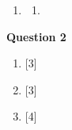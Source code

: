 \begin{enumerate}[label=(\roman*)]
    \item 

        \begin{multicols}{2}
        \begin{enumerate}[label=(\alph*)]
            \item 
        \end{enumerate}
        \end{multicols}

\end{enumerate}

\par
\noindent
\textbf{Question 2}\\
\begin{enumerate}[label=(\roman*)]

    \item \hfill [3]

    \item \hfill [3]

    \item \hfill [4]

\end{enumerate}

